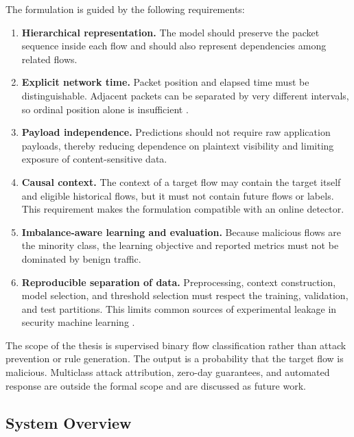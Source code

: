 The formulation is guided by the following requirements:

\begin{enumerate}[label=\textbf{R\arabic*:},leftmargin=*]
    \item \textbf{Hierarchical representation.} The model should preserve the
    packet sequence inside each flow and should also represent dependencies
    among related flows.

    \item \textbf{Explicit network time.} Packet position and elapsed time must
    be distinguishable. Adjacent packets can be separated by very different
    intervals, so ordinal position alone is insufficient
    \cite{Han2023GTID}.

    \item \textbf{Payload independence.} Predictions should not require raw
    application payloads, thereby reducing dependence on plaintext visibility
    and limiting exposure of content-sensitive data.

    \item \textbf{Causal context.} The context of a target flow may contain the
    target itself and eligible historical flows, but it must not contain future
    flows or labels. This requirement makes the formulation compatible with an
    online detector.

    \item \textbf{Imbalance-aware learning and evaluation.} Because malicious
    flows are the minority class, the learning objective and reported metrics
    must not be dominated by benign traffic.

    \item \textbf{Reproducible separation of data.} Preprocessing, context
    construction, model selection, and threshold selection must respect the
    training, validation, and test partitions. This limits common sources of
    experimental leakage in security machine learning
    \cite{Arp2022DosDonts,Ring2019Datasets}.
\end{enumerate}

The scope of the thesis is supervised binary flow classification rather than
attack prevention or rule generation. The output is a probability that the
target flow is malicious. Multiclass attack attribution, zero-day guarantees,
and automated response are outside the formal scope and are discussed as future
work.

\subsection{System Overview}
\label{subsec:system_overview}

